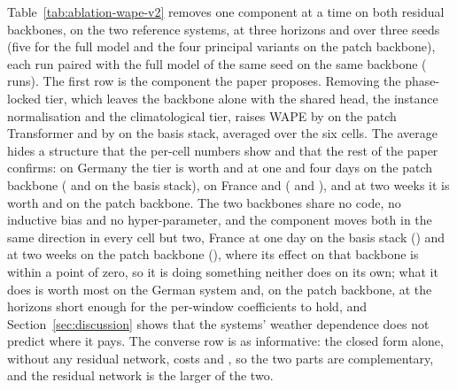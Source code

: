 Table~\ref{tab:ablation-wape-v2} removes one component at a time on both residual backbones,
on the two reference systems, at three horizons and over three seeds (five for the full model
and the four principal variants on the patch backbone), each run paired with the full model of
the same seed on the same backbone ( runs). The first row is the component the
paper proposes. Removing the phase-locked tier, which leaves the backbone alone with the
shared head, the instance normalisation and the climatological tier, raises WAPE by
 on the patch Transformer and by
 on the basis stack, averaged over the six cells. The average
hides a structure that the per-cell numbers show and that the rest of the paper confirms: on
Germany the tier is worth  and
 at one and four days on the patch backbone
( and  on
the basis stack), on France  and
 ( and
), and at two weeks it is worth
 and 
on the patch backbone. The two backbones share no code, no inductive bias and no
hyper-parameter, and the component moves both in the same direction in every cell but two, France at one
day on the basis stack () and at two weeks on the
patch backbone (), where its effect on that
backbone is within a point of zero, so it is doing something neither does on its
own; what it does is worth most on the German system and, on the patch backbone, at the
horizons short enough for the per-window coefficients to hold, and
Section~\ref{sec:discussion} shows that the systems' weather dependence does not predict where
it pays. The
converse row is as informative: the closed form alone, without any residual network, costs
 and , so the two
parts are complementary, and the residual network is the larger of the two.

